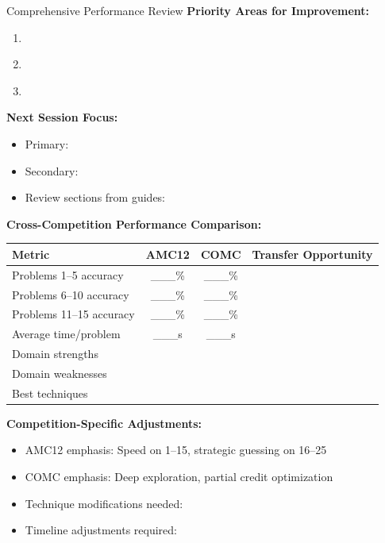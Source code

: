 \documentclass{article}
\begin{document}
\begin{analysisbox}{Comprehensive Performance Review}
\textbf{Priority Areas for Improvement:}
\begin{enumerate}[nosep]
\item \underline{\hspace{8cm}}
\item \underline{\hspace{8cm}}
\item \underline{\hspace{8cm}}
\end{enumerate}

\textbf{Next Session Focus:}
\begin{itemize}[nosep]
\item[$\square$] Primary: \underline{\hspace{6cm}}
\item[$\square$] Secondary: \underline{\hspace{6cm}}
\item[$\square$] Review sections from guides: \underline{\hspace{4cm}}
\end{itemize}

\textbf{Cross-Competition Performance Comparison:}
\begin{center}
\begin{tabular}{|l|c|c|c|}
\hline
\textbf{Metric} & \textbf{AMC12} & \textbf{COMC} & \textbf{Transfer Opportunity} \\
\hline
Problems 1--5 accuracy & \_\_\_\% & \_\_\_\% & \\
Problems 6--10 accuracy & \_\_\_\% & \_\_\_\% & \\
Problems 11--15 accuracy & \_\_\_\% & \_\_\_\% & \\
Average time/problem & \_\_\_s & \_\_\_s & \\
Domain strengths & & & \\
Domain weaknesses & & & \\
Best techniques & & & \\
\hline
\end{tabular}
\end{center}

\textbf{Competition-Specific Adjustments:}
\begin{itemize}[nosep]
\item[$\square$] AMC12 emphasis: Speed on 1--15, strategic guessing on 16--25
\item[$\square$] COMC emphasis: Deep exploration, partial credit optimization
\item[$\square$] Technique modifications needed: \underline{\hspace{5cm}}
\item[$\square$] Timeline adjustments required: \underline{\hspace{5cm}}
\end{itemize}
\end{analysisbox}
\end{document}
